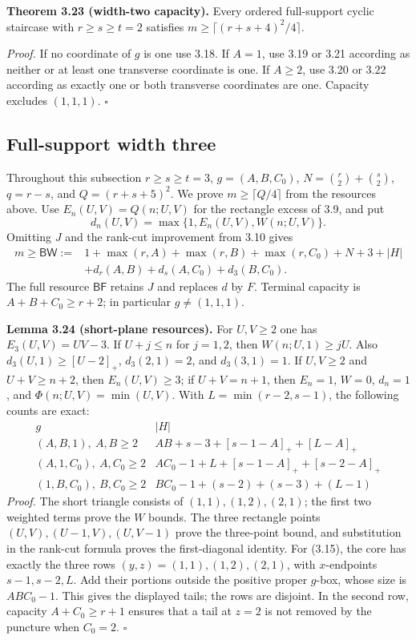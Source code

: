 \documentclass[11pt]{article}
\begin{document}
\label{res:A12.8}
\textbf{Theorem 3.23 (width-two capacity).}
Every ordered full-support cyclic staircase with $r\ge s\ge t=2$
satisfies $m\ge\lceil(r+s+4)^2/4\rceil$.

\emph{Proof.}
If no coordinate of $g$ is one use 3.18.  If $A=1$, use 3.19 or
3.21 according as neither or at least one transverse coordinate is
one.  If $A\ge2$, use 3.20 or 3.22 according as exactly one or both
transverse coordinates are one.  Capacity excludes $(1,1,1)$.
\ensuremath{\square}

\subsection{Full-support width three}

Throughout this subsection $r\ge s\ge t=3$, $g=(A,B,C_0)$,
$N=\binom r2+\binom s2$, $q=r-s$, and $Q=(r+s+5)^2$.
We prove $m\ge\lceil Q/4\rceil$ from the resources above.
Use $E_n(U,V)=Q(n;U,V)$ for the rectangle excess of 3.9, and put
\[
 d_n(U,V)=\max\{1,E_n(U,V),W(n;U,V)\}.
\]
Omitting $J$ and the rank-cut improvement from 3.10 gives
\[
\begin{split}
 m\ge\mathsf{BW}:={}&1+\max(r,A)+\max(r,B)+\max(r,C_0)+N+3+|H|\\
 &+d_r(A,B)+d_s(A,C_0)+d_3(B,C_0).
\end{split}\tag{3.14}
\]
The full resource $\mathsf{BF}$ retains $J$ and replaces $d$ by $F$.
Terminal capacity is $A+B+C_0\ge r+2$; in particular $g\ne(1,1,1)$.

\label{res:A3.1}
\textbf{Lemma 3.24 (short-plane resources).}
For $U,V\ge2$ one has $E_3(U,V)=UV-3$.
If $U+j\le n$ for $j=1,2$, then $W(n;U,1)\ge jU$.
Also $d_3(U,1)\ge[U-2]_+$, $d_3(2,1)=2$, and $d_3(3,1)=1$.
If $U,V\ge2$ and $U+V\ge n+2$, then $E_n(U,V)\ge3$;
if $U+V=n+1$, then $E_n=1$, $W=0$, $d_n=1$, and
$\Phi(n;U,V)=\min(U,V)$.
With $L=\min(r-2,s-1)$, the following counts are exact:
\[
\begin{array}{c|l}
g&|H|\\\hline
(A,B,1),\ A,B\ge2&AB+s-3+[s-1-A]_++[L-A]_+\\
(A,1,C_0),\ A,C_0\ge2&AC_0-1+L+[s-1-A]_++[s-2-A]_+\\
(1,B,C_0),\ B,C_0\ge2&BC_0-1+(s-2)+(s-3)+(L-1)
\end{array}\tag{3.15}
\]
\emph{Proof.}
The short triangle consists of $(1,1),(1,2),(2,1)$; the first two
weighted terms prove the $W$ bounds.  The three rectangle points
$(U,V),(U-1,V),(U,V-1)$ prove the three-point bound, and substitution
in the rank-cut formula proves the first-diagonal identity.
For (3.15), the core has exactly the three rows $(y,z)=(1,1),(1,2),(2,1)$,
with $x$-endpoints $s-1,s-2,L$.  Add their portions outside the positive
proper $g$-box, whose size is $ABC_0-1$.  This gives the displayed tails;
the rows are disjoint.  In the second row, capacity
$A+C_0\ge r+1$ ensures that a tail at $z=2$ is not removed by the puncture
when $C_0=2$. \ensuremath{\square}
\end{document}
